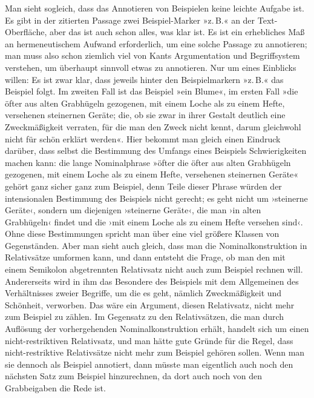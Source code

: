 \documentclass{article}
\begin{document}
Man sieht sogleich, dass das Annotieren von Beispielen keine leichte
Aufgabe ist. Es gibt in der zitierten Passage zwei Beispiel-Marker
»z.\,B.« an der Text-Oberfläche, aber das ist auch schon alles, was
klar ist. Es ist ein erhebliches Maß an hermeneutischem Aufwand
erforderlich, um eine solche Passage zu annotieren; man muss also
schon ziemlich viel von Kants Argumentation und Begriffsystem
verstehen, um überhaupt sinnvoll etwas zu annotieren. Nur um eines
Einblicks willen: Es ist zwar klar, dass jeweils hinter den
Beispielmarkern »z.\,B.« das Beispiel folgt. Im zweiten Fall ist das
Beispiel »ein Blume«, im ersten Fall »die öfter aus alten
Grabhügeln gezogenen, mit einem Loche als zu einem Hefte, versehenen
steinernen Geräte; die, ob sie zwar in ihrer Gestalt deutlich eine
Zweckmäßigkeit verraten, für die man den Zweck nicht kennt, darum
gleichwohl nicht für schön erklärt werden«. Hier bekommt man gleich
einen Eindruck darüber, dass selbst die Bestimmung des Umfangs eines
Beispiels Schwierigkeiten machen kann: die lange Nominalphrase »öfter
die öfter aus alten Grabhügeln gezogenen, mit einem Loche als zu einem
Hefte, versehenen steinernen Geräte« gehört ganz sicher ganz zum
Beispiel, denn Teile dieser Phrase würden der intensionalen Bestimmung
des Beispiels nicht gerecht; es geht nicht um ›steinerne Geräte‹,
sondern um diejenigen ›steinerne Geräte‹, die man ›in alten
Grabhügeln‹ findet und die ›mit einem Loche als zu einem Hefte
versehen sind‹. Ohne diese Bestimmungen spricht man über eine viel
größere Klassen von Gegenständen. Aber man sieht auch gleich, dass man
die Nominalkonstruktion in Relativsätze umformen kann, und dann
entsteht die Frage, ob man den mit einem Semikolon abgetrennten
Relativsatz nicht auch zum Beispiel rechnen will. Andererseits wird in
ihm das Besondere des Beispiels mit dem Allgemeinen des Verhältnisses
zweier Begriffe, um die es geht, nämlich Zweckmäßigkeit und Schönheit,
verworben. Das wäre ein Argument, diesen Relativsatz, nicht mehr zum
Beispiel zu zählen. Im Gegensatz zu den Relativsätzen, die man durch
Auflösung der vorhergehenden Nominalkonstruktion erhält, handelt sich
um einen nicht-restriktiven Relativsatz, und man hätte gute Gründe für
die Regel, dass nicht-restriktive Relativsätze nicht mehr zum Beispiel
gehören sollen. Wenn man sie dennoch als Beispiel annotiert, dann
müsste man eigentlich auch noch den nächsten Satz zum Beispiel
hinzurechnen, da dort auch noch von den Grabbeigaben die Rede ist.
\end{document}

